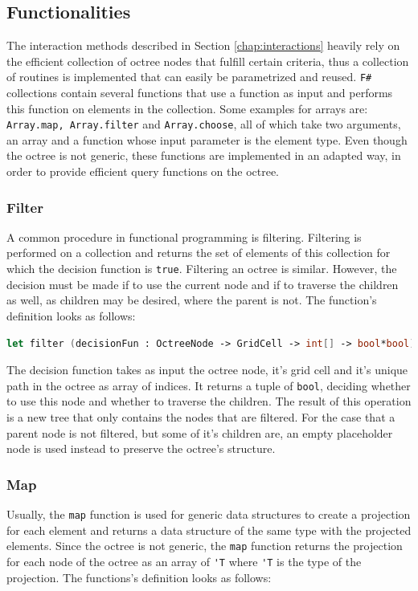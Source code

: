 \subsection{Functionalities}

The interaction methods described in Section \ref{chap:interactions} heavily rely on the efficient collection of octree nodes that fulfill certain criteria, thus a collection of routines is implemented that can easily be parametrized and reused. \verb|F#| collections contain several functions that use a function as input and performs this function on elements in the collection. Some examples for arrays are: \verb|Array.map, Array.filter| and \verb|Array.choose|, all of which take two arguments, an array and a function whose input parameter is the element type. Even though the octree is not generic, these functions are implemented in an adapted way, in order to provide efficient query functions on the octree. 

\subsubsection{Filter}

A common procedure in functional programming is filtering. Filtering is performed on a collection and returns the set of elements of this collection for which the decision function is \verb|true|. Filtering an octree is similar. However, the decision must be made if to use the current node and if to traverse the children as well, as children may be desired, where the parent is not. 
The function's definition looks as follows: 

\begin{lstlisting}[language = FSharp]
let filter (decisionFun : OctreeNode -> GridCell -> int[] -> bool*bool) (tree: Octree) : (Octree)= ...
\end{lstlisting}

The decision function takes as input the octree node, it's grid cell and it's unique path in the octree as array of indices. It returns a tuple of \verb|bool|, deciding whether to use this node and whether to traverse the children. The result of this operation is a new tree that only contains the nodes that are filtered. For the case that a parent node is not filtered, but some of it's children are, an empty placeholder node is used instead to preserve the octree's structure. 


\subsubsection{Map}
Usually, the \verb|map| function is used for generic data structures to create a projection for each element and returns a data structure of the same type with the projected elements. Since the octree is not generic, the \verb|map| function returns the projection for each node of the octree as an array of \verb|'T| where \verb|'T| is the type of the projection. 
The functions's definition looks as follows: 

